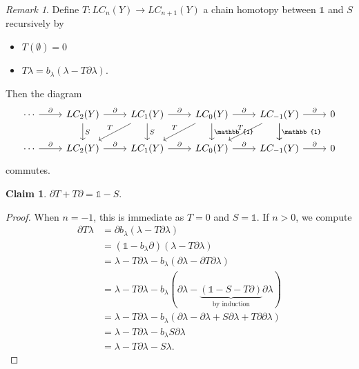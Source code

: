 \documentclass[10pt,letterpaper,cm]{nupset}
\theoremstyle{definition}
\theoremstyle{theorem}
\newtheorem*{claim}{Claim}
\theoremstyle{remark}
\newtheorem{remark}[definition]{Remark}
\newcommand{\1}{\mathbb{1}}
\newcommand{\0}{\vec 0}
\begin{document}
\begin{remark}
Define $T: LC_n(Y) \to LC_{n+1}(Y)$ a chain homotopy between $\1$ and $S$ recursively by 
\begin{itemize}
\item $T(\emptyset) =0$
\item $T\lambda  = b_{\lambda}(\lambda  - T\partial{\lambda})$.
\end{itemize}
Then the diagram
\[
\begin{tikzcd}
\cdots \arrow[r, "\partial"] & LC_2(Y) \arrow[r, "\partial"] \arrow[d, "S"] & LC_1(Y) \arrow[r, "\partial"] \arrow[d, "S"] \arrow[ld, "T"'] & LC_0(Y) \arrow[r, "\partial"] \arrow[d, "\1"] \arrow[ld, "T"'] & LC_{-1}(Y) \arrow[r, "\partial"] \arrow[d, "\1"] \arrow[d] \arrow[ld, "T"'] & 0 \\
\cdots \arrow[r, "\partial"] & LC_2(Y) \arrow[r, "\partial"]                & LC_1(Y) \arrow[r, "\partial"]                                 & LC_0(Y) \arrow[r, "\partial"]                                  & LC_{-1}(Y) \arrow[r, "\partial"]                                            & 0
\end{tikzcd}
\] commutes.
\begin{claim}
$\partial{T} + T\partial = \1 - S$.
\end{claim}
\begin{proof}
When $n= -1$, this is immediate as $T=0$ and $S=\1$. If $n>0$, we compute
\begin{align*}
 \partial{T \lambda} & =  \partial{b_{\lambda}(\lambda  - T\partial{\lambda})}
 \\ & = (\1 - b_{\lambda}{\partial})(\lambda - T{\partial{\lambda}})
 \\ & = \lambda - T\partial{\lambda}- b_{\lambda}(\partial{\lambda} -\partial{T{\partial{\lambda}}})
 \\ & =  \lambda - T\partial{\lambda}- b_{\lambda}(\partial{\lambda} -\underbrace{(\1 -S - T{\partial})}_{\text{by induction}}{\partial{\lambda}})
 \\ & = \lambda - T\partial{\lambda}- b_{\lambda}(\partial{\lambda} - \partial{\lambda} +S{\partial{\lambda}} +T{\partial{\partial}}{\lambda})
 \\ & = \lambda  - T\partial{\lambda}  -b_{\lambda}{S{\partial{\lambda}}}
 \\ & = \lambda  - T\partial{\lambda} -S{\lambda}.
\end{align*}
\end{proof}
\end{remark}
\end{document}
